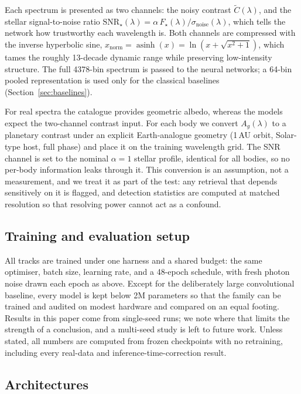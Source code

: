 \documentclass[11pt,twocolumn]{article}
\begin{document}
Each spectrum is presented as two channels: the noisy contrast
$\tilde{C}(\lambda)$, and the stellar signal-to-noise ratio
$\mathrm{SNR}_\star(\lambda)=\alpha\,F_\star(\lambda)/\sigma_\mathrm{noise}
(\lambda)$, which tells the network how trustworthy each wavelength is. Both
channels are compressed with the inverse hyperbolic sine,
$x_\mathrm{norm}=\operatorname{asinh}(x)=\ln(x+\sqrt{x^2+1})$, which tames the
roughly 13-decade dynamic range while preserving low-intensity structure. The
full \num{4378}-bin spectrum is passed to the neural networks; a 64-bin pooled
representation is used only for the classical baselines
(Section~\ref{sec:baselines}).

For real spectra the catalogue provides geometric albedo, whereas the models
expect the two-channel contrast input. For each body we convert $A_g(\lambda)$ to
a planetary contrast under an explicit Earth-analogue geometry (1\,AU orbit,
Solar-type host, full phase) and place it on the training wavelength grid. The
SNR channel is set to the nominal $\alpha{=}1$ stellar profile, identical for all
bodies, so no per-body information leaks through it. This conversion is an
assumption, not a measurement, and we treat it as part of the test: any retrieval
that depends sensitively on it is flagged, and detection statistics are computed
at matched resolution so that resolving power cannot act as a confound.

\subsection{Training and evaluation setup}
\label{sec:setup}

All tracks are trained under one harness and a shared budget: the same optimiser,
batch size, learning rate, and a 48-epoch schedule, with fresh photon noise drawn
each epoch as above. Except for the deliberately large convolutional baseline,
every model is kept below 2M parameters so that the family can be trained and
audited on modest hardware and compared on an equal footing. Results in this
paper come from single-seed runs; we note where that limits the strength of a
conclusion, and a multi-seed study is left to future work. Unless stated, all
numbers are computed from frozen checkpoints with no retraining, including every
real-data and inference-time-correction result.

\subsection{Architectures}
\label{sec:arch}
\end{document}
